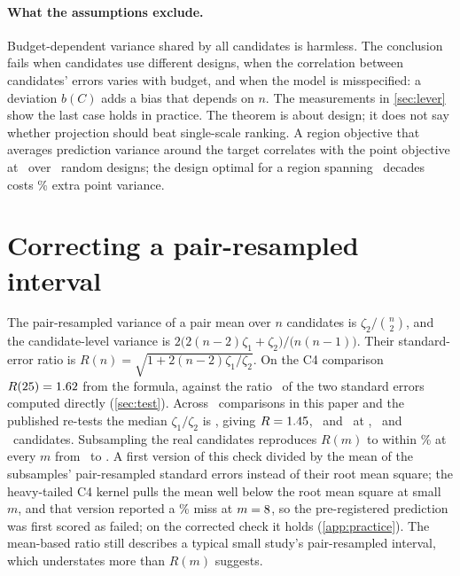 \paragraph{What the assumptions exclude.} Budget-dependent variance shared by
all candidates is harmless. The conclusion fails when candidates use different
designs, when the correlation between candidates' errors varies with budget,
and when the model is misspecified: a deviation $b(C)$ adds a bias that depends
on $n$. The measurements in \cref{sec:lever} show the last case holds in
practice. The theorem is about design; it does not say whether projection
should beat single-scale ranking. A region objective that averages prediction
variance around the target correlates with the point objective at \thmCorr\ over
\thmDesigns\ random designs; the design optimal for a region spanning
\thmRegionDecades\ decades costs \thmExcessThree\% extra point variance.

\FloatBarrier
\section{Correcting a pair-resampled interval}
\label{app:correction}

The pair-resampled variance of a pair mean over $n$ candidates is
$\zeta_2/\binom{n}{2}$, and the candidate-level variance is  %
$2\bigl(2(n-2)\zeta_1+\zeta_2\bigr)/\bigl(n(n-1)\bigr)$. Their standard-error  %
ratio is $R(n)=\sqrt{1+2(n-2)\zeta_1/\zeta_2}$. On the C4 comparison  %
$R(25)=1.62$ from the formula, against the ratio
\dependenceFactor\ of the two standard errors computed directly
(\cref{sec:test}). Across \curveComparisons\ comparisons in this
paper and the published re-tests the median $\zeta_1/\zeta_2$ is
\curveZetaMedian, giving $R=1.45$, \curveMedTwentyFive\ and
\curveMedHundred\ at \curveMSmall, \curveMMid\ and \curveMLarge\ candidates.
Subsampling the real candidates reproduces $R(m)$ to within
\curveCheckWorst\% at every $m$ from \curveCheckMinM\ to \curveCheckMaxM. A
first version of this check divided by the mean of the subsamples'
pair-resampled standard errors instead of their root mean square; the
heavy-tailed C4 kernel pulls the mean well below the root mean square at small
$m$, and that version reported a \curveCheckMeanSeSmallest\% miss at
$m=8$, so the pre-registered prediction was first scored as
failed; on the corrected check it holds (\cref{app:practice}). The mean-based ratio still describes a typical small
study's pair-resampled interval, which understates more than $R(m)$ suggests.

